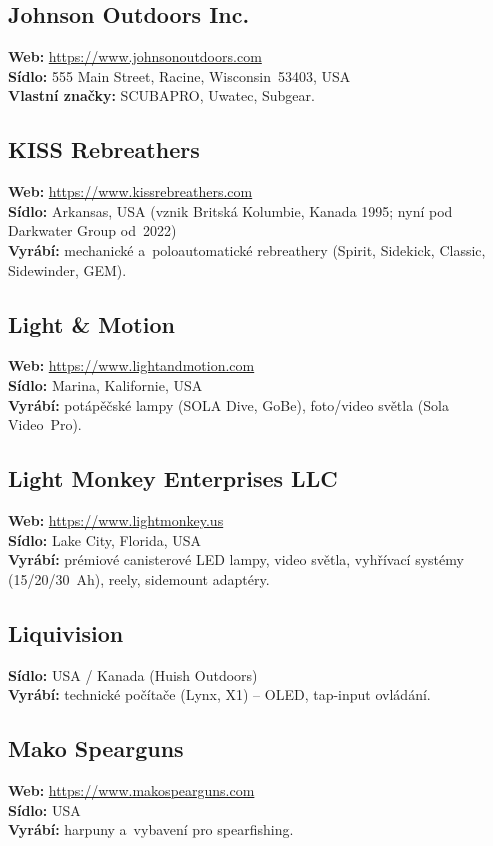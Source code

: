 \documentclass[11pt,a4paper]{article}
\begin{document}
\subsection{Johnson Outdoors Inc.}
\textbf{Web:} \url{https://www.johnsonoutdoors.com} \\
\textbf{Sídlo:} 555 Main Street, Racine, Wisconsin~53403, USA \\
\textbf{Vlastní značky:} SCUBAPRO, Uwatec, Subgear.

\subsection{KISS Rebreathers}
\textbf{Web:} \url{https://www.kissrebreathers.com} \\
\textbf{Sídlo:} Arkansas, USA (vznik Britská Kolumbie, Kanada 1995; nyní pod Darkwater Group od~2022) \\
\textbf{Vyrábí:} mechanické a~poloautomatické rebreathery (Spirit, Sidekick, Classic, Sidewinder, GEM).

\subsection{Light \& Motion}
\textbf{Web:} \url{https://www.lightandmotion.com} \\
\textbf{Sídlo:} Marina, Kalifornie, USA \\
\textbf{Vyrábí:} potápěčské lampy (SOLA Dive, GoBe), foto/video světla (Sola Video~Pro).

\subsection{Light Monkey Enterprises LLC}
\textbf{Web:} \url{https://www.lightmonkey.us} \\
\textbf{Sídlo:} Lake City, Florida, USA \\
\textbf{Vyrábí:} prémiové canisterové LED lampy, video světla, vyhřívací systémy (15/20/30~Ah), reely, sidemount adaptéry.

\subsection{Liquivision}
\textbf{Sídlo:} USA / Kanada (Huish Outdoors) \\
\textbf{Vyrábí:} technické počítače (Lynx, X1) -- OLED, tap-input ovládání.

\subsection{Mako Spearguns}
\textbf{Web:} \url{https://www.makospearguns.com} \\
\textbf{Sídlo:} USA \\
\textbf{Vyrábí:} harpuny a~vybavení pro spearfishing.
\end{document}
